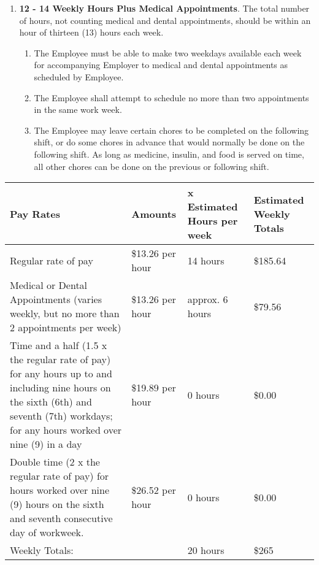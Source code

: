 \documentclass[]{article}
\newcommand{\sw}{.15\textwidth}
\newcommand{\bw}{.39\textwidth}
\begin{document}
\begin{enumerate}
\begin{enumerate}
			\item \textbf{12 - 14 Weekly Hours Plus Medical Appointments}. The total number of hours, not counting medical and dental appointments, should be within an hour of thirteen (13) hours each week. 
				\begin{enumerate}
					\item The Employee must be able to make two weekdays available each week for accompanying Employer to medical and dental appointments as scheduled by Employee.
					\item The Employee shall attempt to schedule no more than two appointments in the same work week.
					\item The Employee may leave certain chores to be completed on the following shift, or do some chores in advance that would normally be done on the following shift. As long as medicine, insulin, and food is served on time, all other chores can be done on the previous or following shift.
				\end{enumerate}
		\end{enumerate}
		\begin{tabular}{|p{\bw}|p{\sw}|p{\sw}|p{\sw}|}
			\hline
			\rowcolor{medgray}
			Pay Rates & Amounts & x Estimated Hours per week & Estimated Weekly Totals\\ \hline
			Regular rate of pay & \$13.26 per hour & 14 hours & \$185.64\\ \hline
			Medical or Dental Appointments (varies weekly, but no more than 2 appointments per week) & \$13.26 per hour & approx. 6 hours & \$79.56\\ \hline
			Time and a half (1.5 x the regular rate of pay) for any hours up to and including nine hours on the sixth (6th) and seventh (7th) workdays; for any hours worked over nine (9) in a day & \$19.89 per hour & 0 hours & \$0.00\\ \hline
			Double time (2 x the regular rate of pay) for hours worked over nine (9) hours on the sixth and seventh consecutive day of workweek. & \$26.52 per hour & 0 hours & \$0.00\\ \hline
			Weekly Totals: & & 20 hours & \$265\\
			\hline
		\end{tabular}
\end{enumerate}
\end{document}
